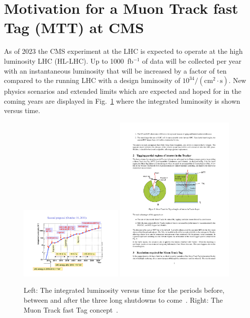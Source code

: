 \section{Motivation for a Muon Track fast Tag (MTT) at CMS}

As of 2023 the CMS experiment at the LHC is expected to operate at the high luminosity LHC (HL-LHC). Up to 1000~fb$^{-1}$ of data will be collected per year with an 
instantaneous luminosity that will be increased by a factor of ten compared to the running LHC with a design luminosity of $10^{34}/(\mathrm{cm}^2 \cdot\mathrm{s})$. New physics 
scenarios and extended limits which are expected and hoped for in the coming years are displayed in Fig.~\ref{fig:schedule_concept} where the integrated luminosity is shown versus 
time. 
\begin{figure}[htbp]
\centering
\includegraphics[width=0.45\textwidth]{Figures/pooth/schedule.pdf}
\includegraphics[width=0.52\textwidth]{Figures/pooth/mtt_concept_a.pdf}
\caption{Left: The integrated luminosity versus time for the periods before, between and after the three long shutdowns to come~\cite{schedule}. Right: The Muon Track fast Tag concept~\cite{mtt_concept}. } 
\label{fig:schedule_concept}
\end{figure}
